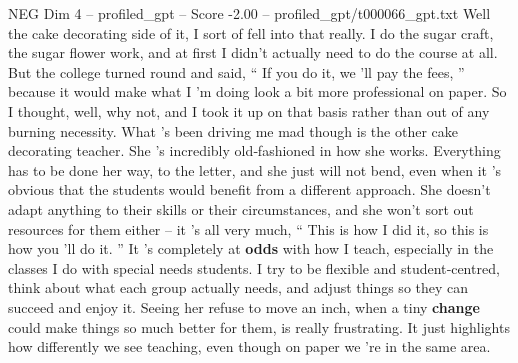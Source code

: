 \begin{textsample}{NEG Dim 4 – profiled\_gpt – Score -2.00 – profiled\_gpt/t000066\_gpt.txt}  \label{ex:f4_neg_014}
Well the cake decorating side of it, I sort of fell into that really.
I do the sugar craft, the sugar flower work, and at first I didn't actually need to do the course at all.
But the college turned round and said, “ If you do it, we ’ll pay the fees, ” because it would make what I ’m doing look a bit more professional on paper.
So I thought, well, why not, and I took it up on that basis rather than out of any burning necessity.
What ’s been driving me mad though is the other cake decorating teacher.
She ’s incredibly old‑fashioned in how she works.
Everything has to be done her way, to the letter, and she just will not bend, even when it ’s obvious that the students would benefit from a different approach.
She doesn't adapt anything to their skills or their circumstances, and she won't sort out resources for them either – it ’s all very much, “ This is how I did it, so this is how you ’ll do it. ” It ’s completely at \textbf{odds} with how I teach, especially in the classes I do with special needs students.
I try to be flexible and student‑centred, think about what each group actually needs, and adjust things so they can succeed and enjoy it.
Seeing her refuse to move an inch, when a tiny \textbf{change} could make things so much better for them, is really frustrating.
It just highlights how differently we see teaching, even though on paper we ’re in the same area.

\end{textsample}
